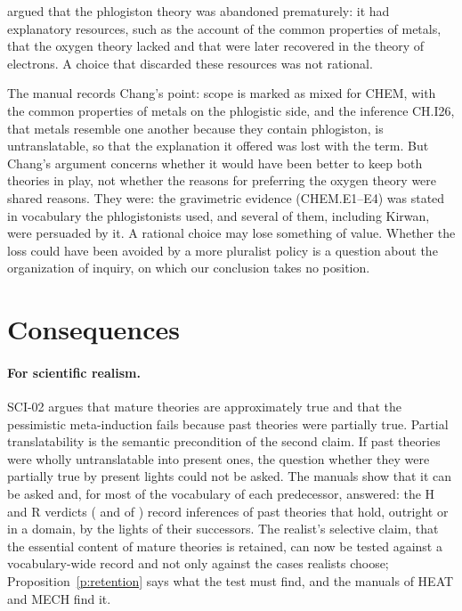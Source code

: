 \documentclass{situationist-preprint}
\begin{document}
\begin{objection}
\citet{Chang2012} argued that the phlogiston theory was abandoned prematurely: it had explanatory resources, such as the account of the common properties of metals, that the oxygen theory lacked and that were later recovered in the theory of electrons. A choice that discarded these resources was not rational.
\end{objection}

\begin{reply}
The manual records Chang's point: scope is marked as mixed for CHEM, with the common properties of metals on the phlogistic side, and the inference CH.I26, that metals resemble one another because they contain phlogiston, is untranslatable, so that the explanation it offered was lost with the term. But Chang's argument concerns whether it would have been better to keep both theories in play, not whether the reasons for preferring the oxygen theory were shared reasons. They were: the gravimetric evidence (CHEM.E1--E4) was stated in vocabulary the phlogistonists used, and several of them, including Kirwan, were persuaded by it. A rational choice may lose something of value. Whether the loss could have been avoided by a more pluralist policy is a question about the organization of inquiry, on which our conclusion takes no position.
\end{reply}

\section{Consequences}\label{s:consequences}

\paragraph{For scientific realism.} SCI-02 argues that mature theories are approximately true and that the pessimistic meta-induction fails because past theories were partially true. Partial translatability is the semantic precondition of the second claim. If past theories were wholly untranslatable into present ones, the question whether they were partially true by present lights could not be asked. The manuals show that it can be asked and, for most of the vocabulary of each predecessor, answered: the H and R verdicts (\nverdH{} and \nverdR{} of \ninfall{}) record inferences of past theories that hold, outright or in a domain, by the lights of their successors. The realist's selective claim, that the essential content of mature theories is retained, can now be tested against a vocabulary-wide record and not only against the cases realists choose; Proposition~\ref{p:retention} says what the test must find, and the manuals of HEAT and MECH find it.
\end{document}
